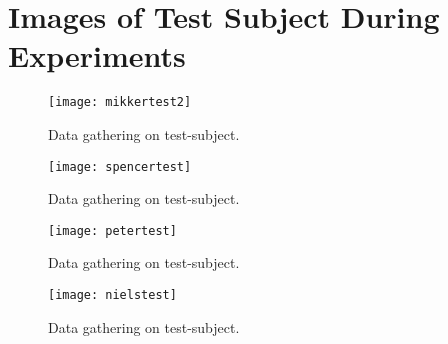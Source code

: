 \section{Images of Test Subject During Experiments}
\label{sec:Images of Test Subject During Experiments}

\begin{figure}
\centering
\texttt{[image: mikkertest2]}
\caption{Data gathering on test-subject.}
\label{fig:mikkertest2}
\end{figure}

\begin{figure}
\centering
\texttt{[image: spencertest]}
\caption{Data gathering on test-subject.}
\label{fig:spencertest}
\end{figure}

\begin{figure}
\centering
\texttt{[image: petertest]}
\caption{Data gathering on test-subject.}
\label{fig:petertest}
\end{figure}

\begin{figure}
\centering
\texttt{[image: nielstest]}
\caption{Data gathering on test-subject.}
\label{fig:nielstest}
\end{figure}
